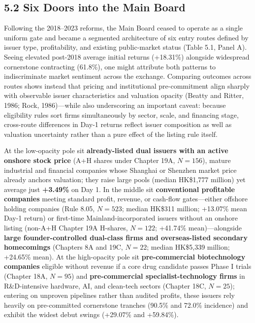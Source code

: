 \documentclass[11pt,letterpaper]{article}
\begin{document}
\subsection*{\texorpdfstring{5.2 Six Doors into the Main Board}{5.2 Six Doors into the Main Board}}
Following the 2018–2023 reforms, the Main Board ceased to operate as a single uniform gate and became a segmented architecture of six entry routes defined by issuer type, profitability, and existing public-market status (Table 5.1, Panel A). Seeing elevated post-2018 average initial returns (+18.31\%) alongside widespread cornerstone contracting (61.8\%), one might attribute both patterns to indiscriminate market sentiment across the exchange. Comparing outcomes across routes shows instead that pricing and institutional pre-commitment align sharply with observable issuer characteristics and valuation opacity (Beatty and Ritter, 1986; Rock, 1986)—while also underscoring an important caveat: because eligibility rules sort firms simultaneously by sector, scale, and financing stage, cross-route differences in Day-1 returns reflect issuer composition as well as valuation uncertainty rather than a pure effect of the listing rule itself.

At the low-opacity pole sit \textbf{already-listed dual issuers with an active onshore stock price} (A+H shares under Chapter 19A, $N = 156$), mature industrial and financial companies whose Shanghai or Shenzhen market price already anchors valuation; they raise large pools (median HK\$1,777 million) yet average just \textbf{+3.49\%} on Day 1. In the middle sit \textbf{conventional profitable companies} meeting standard profit, revenue, or cash-flow gates—either offshore holding companies (Rule 8.05, $N = 523$; median HK\$311 million; +13.07\% mean Day-1 return) or first-time Mainland-incorporated issuers without an onshore listing (non-A+H Chapter 19A H-shares, $N = 122$; +41.74\% mean)—alongside \textbf{large founder-controlled dual-class firms and overseas-listed secondary homecomings} (Chapters 8A and 19C, $N = 22$; median HK\$5,339 million; +24.65\% mean). At the high-opacity pole sit \textbf{pre-commercial biotechnology companies} eligible without revenue if a core drug candidate passes Phase I trials (Chapter 18A, $N = 95$) and \textbf{pre-commercial specialist-technology firms} in R\&D-intensive hardware, AI, and clean-tech sectors (Chapter 18C, $N = 25$); entering on unproven pipelines rather than audited profits, these issuers rely heavily on pre-committed cornerstone tranches (90.5\% and 72.0\% incidence) and exhibit the widest debut swings (+29.07\% and +59.84\%).
\end{document}
